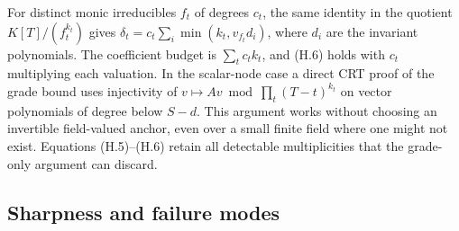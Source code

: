 \documentclass[
  11pt,
]{article}
\begin{document}
For distinct monic irreducibles \(f_t\) of degrees \(c_t\), the same
identity in the quotient \(K[T]/(f_t^{k_t})\) gives
\(\delta_t=c_t\sum_i\min(k_t,v_{f_t}d_i)\), where \(d_i\) are the
invariant polynomials. The coefficient budget is \(\sum_t c_tk_t\), and
(H.6) holds with \(c_t\) multiplying each valuation. In the scalar-node
case a direct CRT proof of the grade bound uses injectivity of
\(v\mapsto Av\bmod\prod_t(T-t)^{k_t}\) on vector polynomials of degree
below \(S-d\). This argument works without choosing an invertible
field-valued anchor, even over a small finite field where one might not
exist. Equations (H.5)--(H.6) retain all detectable multiplicities that
the grade-only argument can discard.

\subsection{Sharpness and failure
modes}\label{sharpness-and-failure-modes}
\end{document}
